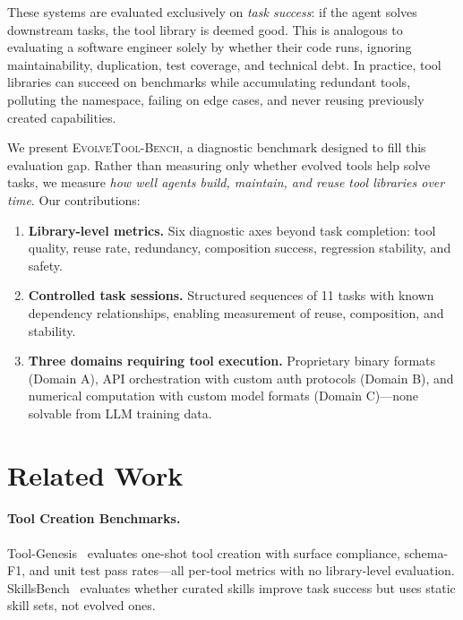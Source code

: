 \documentclass[10pt,twocolumn]{article}
\begin{document}
These systems are evaluated exclusively on \emph{task success}: if the agent solves downstream tasks, the tool library is deemed good. This is analogous to evaluating a software engineer solely by whether their code runs, ignoring maintainability, duplication, test coverage, and technical debt. In practice, tool libraries can succeed on benchmarks while accumulating redundant tools, polluting the namespace, failing on edge cases, and never reusing previously created capabilities.

We present \textsc{EvolveTool-Bench}, a diagnostic benchmark designed to fill this evaluation gap. Rather than measuring only whether evolved tools help solve tasks, we measure \emph{how well agents build, maintain, and reuse tool libraries over time}. Our contributions:

\begin{enumerate}
\item \textbf{Library-level metrics.} Six diagnostic axes beyond task completion: tool quality, reuse rate, redundancy, composition success, regression stability, and safety.

\item \textbf{Controlled task sessions.} Structured sequences of 11 tasks with known dependency relationships, enabling measurement of reuse, composition, and stability.

\item \textbf{Three domains requiring tool execution.} Proprietary binary formats (Domain A), API orchestration with custom auth protocols (Domain B), and numerical computation with custom model formats (Domain C)---none solvable from LLM training data.
\end{enumerate}

\section{Related Work}

\paragraph{Tool Creation Benchmarks.} Tool-Genesis~\cite{xia2026toolgenesis} evaluates one-shot tool creation with surface compliance, schema-F1, and unit test pass rates---all per-tool metrics with no library-level evaluation. SkillsBench~\cite{skillsbench2026} evaluates whether curated skills improve task success but uses static skill sets, not evolved ones.
\end{document}
